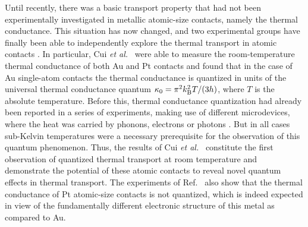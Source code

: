 \documentclass[aps,amsmath,amssymb,twocolumn,showpacs]{revtex4-1}
\begin{document}
Until recently, there was a basic transport property that had not been
experimentally investigated in metallic atomic-size contacts, namely the
thermal conductance. This situation has now changed, and two experimental
groups have finally been able to independently explore the thermal transport
in atomic contacts \cite{Cui2017,Mosso2017}. In particular, Cui \emph{et
  al.}\ \cite{Cui2017} were able to measure the room-temperature thermal
conductance of both Au and Pt contacts and found that in the case of Au
single-atom contacts the thermal conductance is quantized in units of the
universal thermal conductance quantum $\kappa_0 = \pi^2 k^2_{\rm B} T/(3h)$,
where $T$ is the absolute temperature. Before this, thermal conductance
quantization had already been reported in a series of experiments, making use
of different microdevices, where the heat was carried by phonons, electrons or
photons
\cite{Schwab2000,Chiatti2006,Meschke2006,Jezouin2013,Partanen2016}. But in all
cases sub-Kelvin temperatures were a necessary prerequisite for the
observation of this quantum phenomenon. Thus, the results of Cui \emph{et
  al.}\ \cite{Cui2017} constitute the first observation of quantized thermal
transport at room temperature and demonstrate the potential of these atomic
contacts to reveal novel quantum effects in thermal transport. The experiments
of Ref.~ also show that the thermal conductance of Pt
atomic-size contacts is not quantized, which is indeed expected in view of the
fundamentally different electronic structure of this metal as compared to Au.
\end{document}
